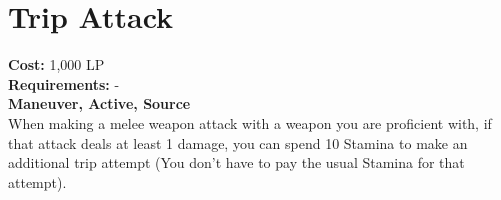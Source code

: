 \section{Trip Attack}\label{maneuver:tripAttack}
\textbf{Cost:} 1,000 LP\\
\textbf{Requirements:} -\\
\textbf{Maneuver, Active, Source}\\
When making a melee weapon attack with a weapon you are proficient with, if that attack deals at least 1 damage, you can spend 10 Stamina to make an additional trip attempt (You don't have to pay the usual Stamina for that attempt).\\
